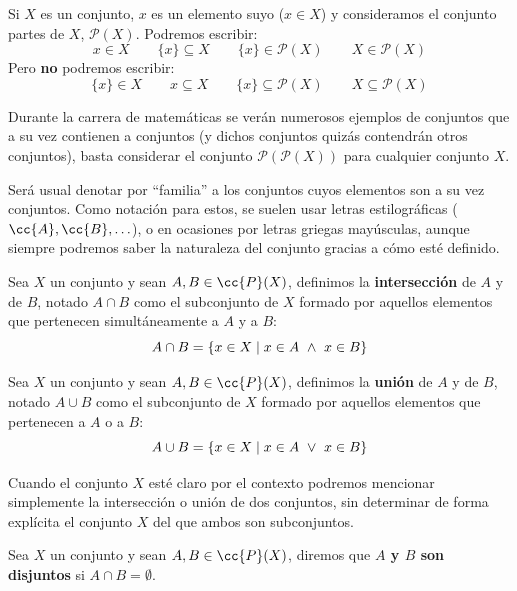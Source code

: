 \begin{ejemplo}
    Si $X$ es un conjunto, $x$ es un elemento suyo ($x\in X$) y consideramos el conjunto partes de $X$, $\mathcal{P}(X)$. Podremos escribir:
    \begin{equation*}
        x\in X \qquad \{x\} \subseteq X \qquad \{x\} \in  \mathcal{P}(X) \qquad X \in \mathcal{P}(X)
    \end{equation*}
    Pero \textbf{no} podremos escribir:
    \begin{equation*}
        \{x\} \in X \qquad x \subseteq X \qquad \{x\} \subseteq \mathcal{P}(X) \qquad X \subseteq \mathcal{P}(X)
    \end{equation*}
\end{ejemplo}

Durante la carrera de matemáticas se verán numerosos ejemplos de conjuntos que a su vez contienen a conjuntos (y dichos conjuntos quizás contendrán otros conjuntos), basta considerar el conjunto $\mathcal{P}(\mathcal{P}(X))$ para cualquier conjunto $X$. 

Será usual denotar por ``familia'' a los conjuntos cuyos elementos son a su vez conjuntos. Como notación para estos, se suelen usar letras estilográficas ($\cc{A}, \cc{B}, \ldots$), o en ocasiones por letras griegas mayúsculas, aunque siempre podremos saber la naturaleza del conjunto gracias a cómo esté definido.

\begin{definicion}[Intersección]
    Sea $X$ un conjunto y sean $A, B \in \cc{P}(X)$, definimos la \textbf{intersección} de $A$ y de $B$, notado
    $A \cap B$ como el subconjunto de $X$ formado por aquellos elementos que pertenecen simultáneamente
    a $A$ y a $B$:
    $$A \cap B = \{x \in X \mid x \in A \ \land \  x \in B\}$$
\end{definicion}

\begin{definicion}[Unión]
    Sea $X$ un conjunto y sean $A, B \in \cc{P}(X)$, definimos la \textbf{unión} de $A$ y de $B$, notado
    $A \cup B$ como el subconjunto de $X$ formado por aquellos elementos que pertenecen a $A$ o a $B$:
    $$A \cup B = \{x \in X \mid x \in A \ \lor \  x \in B\}$$
\end{definicion}

Cuando el conjunto $X$ esté claro por el contexto podremos mencionar simplemente la intersección o unión de dos conjuntos, sin determinar de forma explícita el conjunto $X$ del que ambos son subconjuntos.

\begin{definicion}[Disjuntos]
    Sea $X$ un conjunto y sean $A, B \in \cc{P}(X)$, diremos que \textbf{$A$ y $B$ son disjuntos} si
    $A \cap B = \emptyset$.
\end{definicion}

